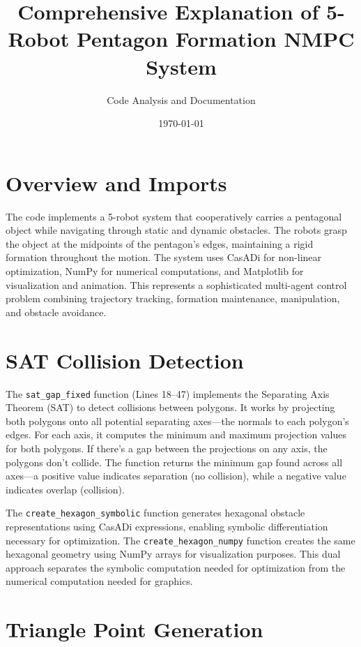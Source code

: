 \documentclass[12pt,a4paper]{article}
\title{\textbf{Comprehensive Explanation of 5-Robot Pentagon Formation NMPC System}}
\author{Code Analysis and Documentation}
\date{\today}
\begin{document}
\maketitle

\section{Overview and Imports}

The code implements a 5-robot system that cooperatively carries a pentagonal object while navigating through static and dynamic obstacles. The robots grasp the object at the midpoints of the pentagon's edges, maintaining a rigid formation throughout the motion. The system uses CasADi for non-linear optimization, NumPy for numerical computations, and Matplotlib for visualization and animation. This represents a sophisticated multi-agent control problem combining trajectory tracking, formation maintenance, manipulation, and obstacle avoidance.

\section{SAT Collision Detection}

The \texttt{sat\_gap\_fixed} function (Lines 18--47) implements the Separating Axis Theorem (SAT) to detect collisions between polygons. It works by projecting both polygons onto all potential separating axes---the normals to each polygon's edges. For each axis, it computes the minimum and maximum projection values for both polygons. If there's a gap between the projections on any axis, the polygons don't collide. The function returns the minimum gap found across all axes---a positive value indicates separation (no collision), while a negative value indicates overlap (collision).

The \texttt{create\_hexagon\_symbolic} function generates hexagonal obstacle representations using CasADi expressions, enabling symbolic differentiation necessary for optimization. The \texttt{create\_hexagon\_numpy} function creates the same hexagonal geometry using NumPy arrays for visualization purposes. This dual approach separates the symbolic computation needed for optimization from the numerical computation needed for graphics.

\section{Triangle Point Generation}
\end{document}
